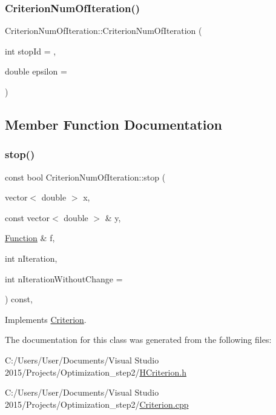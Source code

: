 \subsubsection{\texorpdfstring{Criterion\+Num\+Of\+Iteration()}{CriterionNumOfIteration()}}
{\footnotesize\ttfamily Criterion\+Num\+Of\+Iteration\+::\+Criterion\+Num\+Of\+Iteration (\begin{DoxyParamCaption}\item[{int}]{stop\+Id = {},  }\item[{double}]{epsilon = {} }\end{DoxyParamCaption})\hspace{0.3cm}{\ttfamily [inline]}}



\subsection{Member Function Documentation}
\mbox{\label{class_criterion_num_of_iteration_a9885d8e39da442c5ac1049e0546ffdfd}} 
\subsubsection{\texorpdfstring{stop()}{stop()}}
{\footnotesize\ttfamily const bool Criterion\+Num\+Of\+Iteration\+::stop (\begin{DoxyParamCaption}\item[{vector$<$ double $>$}]{x,  }\item[{const vector$<$ double $>$ \&}]{y,  }\item[{\hyperlink{class_function}{Function} \&}]{f,  }\item[{int}]{n\+Iteration,  }\item[{int}]{n\+Iteration\+Without\+Change = {} }\end{DoxyParamCaption}) const\hspace{0.3cm}{\ttfamily [override]}, {\ttfamily [virtual]}}



Implements \hyperlink{class_criterion_aee3e2148c665c72c50c2f870a3ca8cdc}{Criterion}.



The documentation for this class was generated from the following files\+:\begin{DoxyCompactItemize}
\item 
C\+:/\+Users/\+User/\+Documents/\+Visual Studio 2015/\+Projects/\+Optimization\+\_\+step2/\hyperlink{_h_criterion_8h}{H\+Criterion.\+h}\item 
C\+:/\+Users/\+User/\+Documents/\+Visual Studio 2015/\+Projects/\+Optimization\+\_\+step2/\hyperlink{_criterion_8cpp}{Criterion.\+cpp}\end{DoxyCompactItemize}
